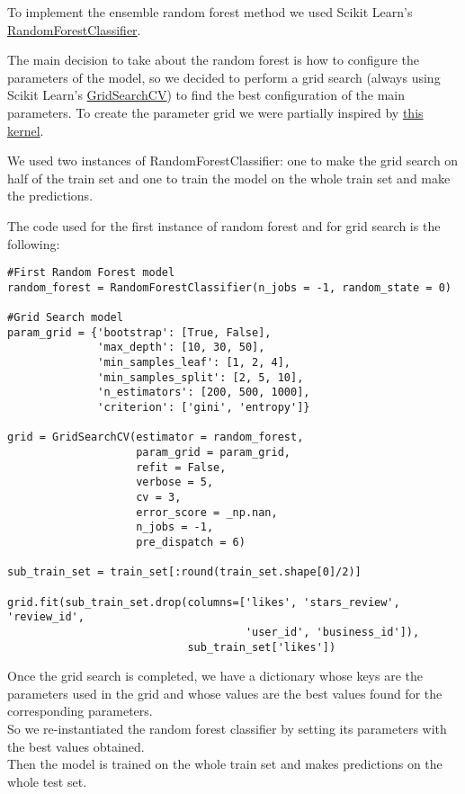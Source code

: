 To implement the ensemble random forest method we used Scikit Learn's \href{https://scikit-learn.org/stable/modules/generated/sklearn.ensemble.RandomForestClassifier.html}{RandomForestClassifier}.

The main decision to take about the random forest is how to configure the parameters of the model, so we decided to perform a grid search (always using Scikit Learn's \href{https://scikit-learn.org/stable/modules/generated/sklearn.model_selection.GridSearchCV.html}{GridSearchCV}) to find the best configuration of the main parameters. To create the parameter grid we were partially inspired by \href{https://www.kaggle.com/sociopath00/random-forest-using-gridsearchcv}{this kernel}.

We used two instances of RandomForestClassifier: one to make the grid search on half of the train set and one to train the model on the whole train set and make the predictions.

The code used for the first instance of random forest and for grid search is the following:

\begin{lstlisting}[caption={Random Forest model},label={lst:rf-model}]
#First Random Forest model
random_forest = RandomForestClassifier(n_jobs = -1, random_state = 0)

#Grid Search model
param_grid = {'bootstrap': [True, False],
              'max_depth': [10, 30, 50],
              'min_samples_leaf': [1, 2, 4],
              'min_samples_split': [2, 5, 10],
              'n_estimators': [200, 500, 1000],
              'criterion': ['gini', 'entropy']}

grid = GridSearchCV(estimator = random_forest, 
                    param_grid = param_grid, 
                    refit = False, 
                    verbose = 5, 
                    cv = 3, 
                    error_score = _np.nan, 
                    n_jobs = -1, 
                    pre_dispatch = 6)

sub_train_set = train_set[:round(train_set.shape[0]/2)]

grid.fit(sub_train_set.drop(columns=['likes', 'stars_review', 'review_id', 
                                     'user_id', 'business_id']),
                            sub_train_set['likes'])
\end{lstlisting}

Once the grid search is completed, we have a dictionary whose keys are the parameters used in the grid and whose values are the best values found for the corresponding parameters.\\
So we re-instantiated the random forest classifier by setting its parameters with the best values obtained.\\
Then the model is trained on the whole train set and makes predictions on the whole test set.

